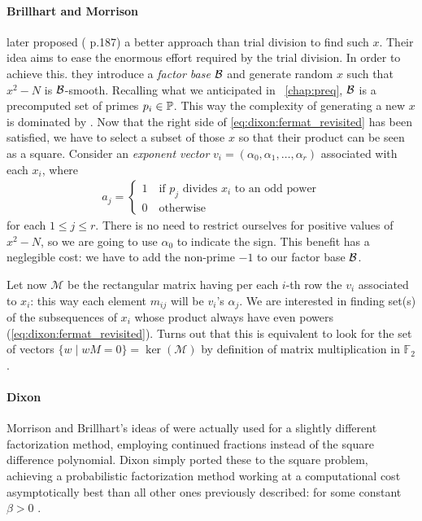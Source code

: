 \paragraph{Brillhart and Morrison} later proposed (\cite{morrison-brillhart}
p.187) a better approach than trial division to find such $x$. Their idea aims
to ease the enormous effort required by the trial division. In order to achieve
this. they introduce a \emph{factor base} $\mathcal{B}$ and generate random $x$
such that $x^2 - N$ is $\mathcal{B}$-smooth. Recalling what we anticipated in
~\ref{chap:preq}, $\mathcal{B}$ is a precomputed set of primes
$p_i \in \mathbb{P}$.
This way the complexity of generating a new $x$ is dominated by
\bigO{|\factorBase|}. Now that the right side of \ref{eq:dixon:fermat_revisited}
has been satisfied, we have to select a subset of those $x$ so that their
product can be seen as a square. Consider an \emph{exponent vector}
$v_i = (\alpha_0, \alpha_1, \ldots, \alpha_r)$ associated with each $x_i$, where
\begin{align*}
  a_j = \begin{cases}
    1 \quad \text{if $p_j$ divides $x_i$ to an odd power} \\
    0 \quad \text{otherwise}
    \end{cases}
\end{align*}
for each $1 \leq j \leq r $. There is no need to restrict ourselves for positive
values of $x^2 -N$, so we are going to use $\alpha_0$ to indicate the sign. This
benefit has a neglegible cost: we have to add the non-prime $-1$ to our factor
base $\mathcal{B}$.

Let now $\mathcal{M}$ be the rectangular matrix having per each $i$-th row the
$v_i$ associated to $x_i$: this way each element $m_{ij}$ will be $v_i$'s
$\alpha_j$. We are interested in finding set(s) of the subsequences of $x_i$
whose product always have even powers (\ref{eq:dixon:fermat_revisited}).
Turns out that this is equivalent to look for the set of vectors
$\{ w \mid wM = 0 \} = \ker(\mathcal{M})$ by definition of matrix multiplication
in $\mathbb{F}_2$.


\paragraph{Dixon} Morrison and Brillhart's ideas of \cite{morrison-brillhart}
were actually used for a slightly different factorization method, employing
continued fractions instead of the square difference polynomial. Dixon simply
ported these to the square problem, achieving a probabilistic factorization
method working at a computational cost asymptotically  best than all other ones
previously described:  for some
constant $\beta > 0$ \cite{dixon}.

